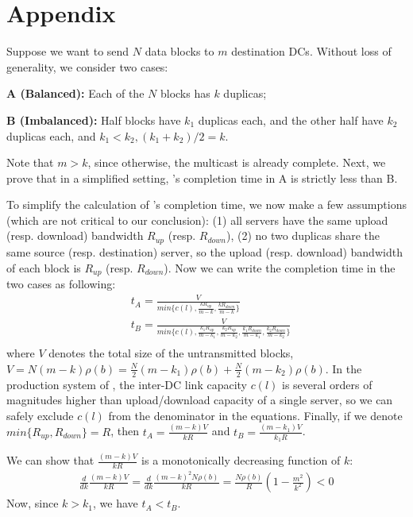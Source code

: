 \section{Appendix}

Suppose we want to send $N$ data blocks to $m$ destination DCs. Without
loss of generality, we consider two cases:
\begin{packeditemize}
\item {\bf A (Balanced):} Each of the $N$ blocks has $k$ duplicas;
\item {\bf B (Imbalanced):} Half blocks have $k_1$ duplicas each, and the
other half have $k_2$ duplicas each, and $k_1<k_2, (k_1+k_2)/2=k$.
\end{packeditemize}
Note that $m>k$, since otherwise, the multicast is already complete.
Next, we prove that in a simplified setting, \name's completion time in A
is strictly less than B.

To simplify the calculation of \name's completion time, we now make a few
assumptions (which are not critical to our conclusion): (1) all servers
have the same upload (resp. download) bandwidth $R_{up}$ (resp. $R_{down}$),
(2) no two duplicas share the same source (resp. destination) server, so
the upload (resp. download) bandwidth of each block is $R_{up}$ (resp.
$R_{down}$).
Now we can write the completion time in the two cases as following:
\begin{equation}
\label{equa:caseK}
\begin{split}
& t_A = \frac{V}{min\{c(l),\frac{k R_{up}}{m-k},
\frac{k R_{down}}{m-k}\}}\\
& t_B = \frac{V}{min\{c(l),
\frac{k_1 R_{up}}{m-k_1},
\frac{k_2 R_{up}}{m-k_2},
\frac{k_1 R_{down}}{m-k_1},
\frac{k_2 R_{down}}{m-k_2}\}}\\
\end{split}
\end{equation}
where $V$ denotes the total size of the untransmitted blocks,
$V=N(m-k)\rho(b)=
\frac{N}{2}(m-k_1)\rho(b)+\frac{N}{2}(m-k_2) \rho(b)$.
In the production system of \company, the inter-DC link capacity $c(l)$ is
several orders of magnitudes higher than upload/download capacity of a
single server, so we can safely exclude $c(l)$ from the denominator in the
equations.
Finally, if we denote $min\{R_{up},R_{down}\}=R$, then
$t_A=\frac{(m-k)V}{k R}$ and
$t_B=\frac{(m-k_1)V}{k_1 R}$.

We can show that $\frac{(m-k)V}{k R}$ is a monotonically decreasing
function of $k$:
\begin{equation}
\label{calculus}
\begin{split}
\frac{d}{dk}\frac{(m-k)V}{k R}
=\frac{d}{dk}\frac{(m-k)^2N\rho(b)}{k R}
=\frac{N \rho(b)}{R}  (1-\frac{m^2}{k^2})<0
\end{split}
\end{equation}
Now, since $k>k_1$, we have $t_A<t_B$.

